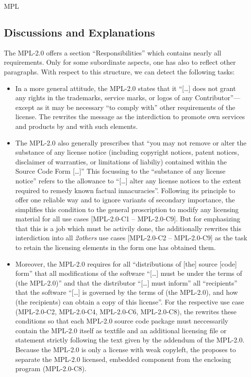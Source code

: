 \begin{license}{MPL}
\subsection{Discussions and Explanations}

The MPL-2.0 offers a section \enquote{Responsibilities} which contains nearly all
requirements. Only for some subordinate aspects, one has also to
reflect other paragraphs.
With respect to this structure, we can detect the following tasks:

\begin{itemize}

\item In a more general attitude, the MPL-2.0 states that it \enquote{[\ldots]
  does not grant any rights in the trademarks, service marks, or logos of any
  Contributor}---except as it may be necessary \enquote{to comply with} other
  requirements of the license. The \oslic{} rewrites the message
  as the interdiction to promote own services and products by and with such
  elements. 
  
\item The MPL-2.0 also generally prescribes that \enquote{you may not remove or
  alter the substance of any license notice (including copyright notices, patent
  notices, disclaimer of warranties, or limitations of liabiliy) contained
  within the Source Code Form [\ldots]} This focussing to the
  \enquote{substance of any license notice} refers to the allowance to
  \enquote{[\ldots] alter any license notices to the extent required to remedy
  known factual innacuracies}.  Following its principle to offer
  one reliable way and to ignore variants of secondary importance, the \oslic{}
  simplifies this condition to the general proscription to modify any licensing
  material for all use cases [MPL-2.0-C1 -- MPL-2.0-C9]. But for emphasizing
  that this is a job which must be activily done, the \oslic{} additionally
  rewrites this interdiction into all \emph{2others} use cases [MPL-2.0-C2 --
  MPL-2.0-C9] as the task to retain the licensing elements in the form one has
  obtained them. 
  
\item Moreover, the MPL-2.0 requires for all \enquote{distributions of [the]
  source [code] form} that all modifications of the software \enquote{[\ldots] 
  must be under the terms of (the MPL-2.0)} and that the distributor
  \enquote{[\ldots] must inform} all \enquote{recipients} that the software
  \enquote{[\ldots] is governed by the terms of (the MPL-2.0), and how (the
  recipients) can obtain a copy of this license}.  For the
  respective use case (MPL-2.0-C2, MPL-2.0-C4, MPL-2.0-C6, MPL-2.0-C8), the
  \oslic{} rewrites these conditions so that each MPL-2.0 source code package
  must neccessarily contain the MPL-2.0 itself as textfile and an additional 
  licensing file or statement strictly following the text given by the addendum
  of the MPL-2.0. Because the MPL-2.0 is only a license with
  weak copyleft, the \oslic{} proposes to separate the MPL-2.0 licensed,
  embedded component from the enclosing program (MPL-2.0-C8). 
  

\end{itemize}
\end{license}
